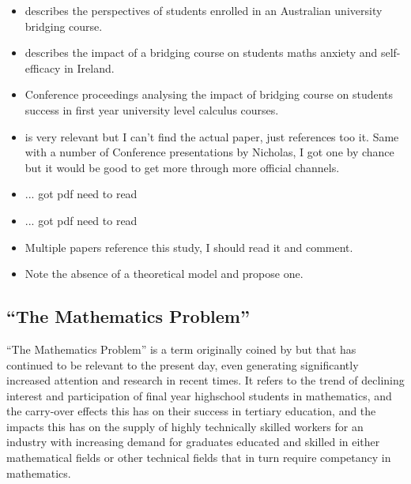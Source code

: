\documentclass[twoside,12pt,a4paper]{report}
\begin{document}
\begin{itemize}
	\item \cite{Gordon2013} describes the perspectives of students enrolled in an Australian university bridging course.
	\item \cite{Johnson2016} describes the impact of a bridging course on students maths anxiety and self-efficacy in Ireland.
	\item \cite{Poladian2013} Conference proceedings analysing the impact of bridging course on students success in first year university level calculus courses.
	\item \cite{Nicholas2015} is very relevant but I can't find the actual paper, just references too it. Same with a number of Conference presentations by Nicholas, I got one by chance but it would be good to get more through more official channels.
	\item \cite{Gordon2015} ... got pdf need to read
	\item \cite{Nicholas2015b} ... got pdf need to read
	\item \cite{Kajander2005} Multiple papers reference this study, I should read it and comment.
	\item \cite{Clark2008} Note the absence of a theoretical model and propose one.
\end{itemize}

\subsection{``The Mathematics Problem''}

``The Mathematics Problem'' is a term originally coined by \cite{Howson1995} but that has continued to be relevant to the present day, even generating significantly increased attention and research in recent times. It refers to the trend of declining interest and participation of final year highschool students in mathematics, and the carry-over effects this has on their success in tertiary education, and the impacts this has on the supply of highly technically skilled workers for an industry with increasing demand for graduates educated and skilled in either mathematical fields or other technical fields that in turn require competancy in mathematics.
\end{document}
